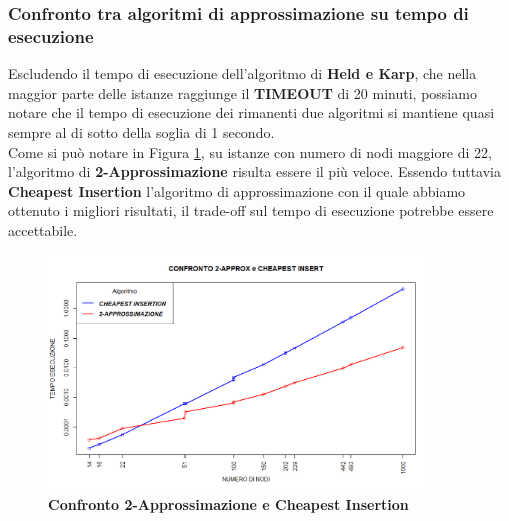 \documentclass[]{article}
\begin{document}
\begin{flushleft}
\subsubsection{Confronto tra algoritmi di approssimazione su tempo di esecuzione}
Escludendo il tempo di esecuzione dell'algoritmo di \textbf{Held e Karp}, che nella maggior parte delle istanze raggiunge il \textbf{TIMEOUT} di 20 minuti, possiamo notare che il tempo di esecuzione dei rimanenti due algoritmi si mantiene quasi sempre al di sotto della soglia di 1 secondo.\\
Come si può notare in Figura \ref{app-cheap}, su istanze con numero di nodi maggiore di 22, l'algoritmo di \textbf{2-Approssimazione} risulta essere il più veloce. Essendo tuttavia \textbf{Cheapest Insertion} l'algoritmo di approssimazione con il quale abbiamo ottenuto i migliori risultati, il trade-off sul tempo di esecuzione potrebbe essere accettabile.
\begin{figure}[h]
	\centering
	\includegraphics[width=0.9\textwidth,height=\textheight,keepaspectratio]{TEMPO_SU_NODI_2_CHEAP_NEW.png}
	\caption{\textbf{Confronto 2-Approssimazione e Cheapest Insertion}}
	\label{app-cheap}
\end{figure}

\newpage

\end{flushleft}
\end{document}
